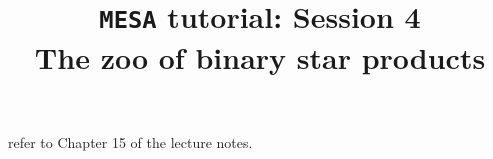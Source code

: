 \documentclass[11pt,a4paper]{article}
\begin{document}
\title{
    \textbf{\texttt{MESA} tutorial: Session 4} \\
    \textbf{\Large The zoo of binary star products}
}
\date{}
\maketitle
\vspace{-1cm}

\noindent

refer to Chapter 15 of the lecture notes.



\end{document}
